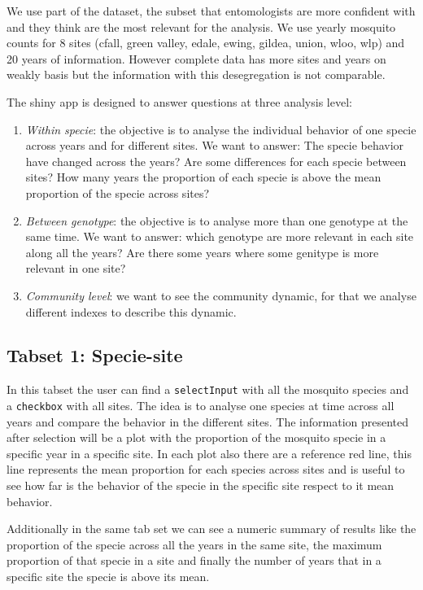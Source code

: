 \documentclass{article}\usepackage[]{graphicx}\usepackage[]{color}
\begin{document}
We use part of the dataset, the subset that entomologists are more confident with and they think are the most relevant for the analysis. We use yearly mosquito counts for 8 sites (cfall, green valley, edale, ewing, gildea, union, wloo, wlp) and 20 years of information. However complete data has more sites and years on weakly basis but the information with this desegregation is not comparable. 

The shiny app is designed to answer questions at three analysis level:
\begin{enumerate}
\item \textit{Within specie}:  the objective is to analyse the individual behavior of one specie across years and for different sites. We want to answer:
The specie behavior have changed across the years? Are some differences for each specie between sites?  How many years the proportion of each specie is above the mean proportion of the specie across sites?
\item \textit{Between genotype}: the objective is to analyse more than one genotype at the same time. We want to answer: which genotype are more relevant in each site along all the years? Are there some years where some genitype is more relevant in one site?
\item \textit{Community level}: we want to see the community dynamic, for that we analyse different indexes to describe this dynamic. 
\end{enumerate}


\subsection{Tabset 1: Specie-site}
In this tabset the user can find a {\tt selectInput} with all the mosquito species and a {\tt checkbox} with all sites. The idea is to analyse one species at time across all years and compare the behavior in the different sites. The information presented after selection will be a plot with the proportion of the mosquito specie in a specific year in a specific site. In each plot also there are a reference red line, this line represents the mean proportion for each species across sites  and is useful to see how far is the behavior of the specie in the specific site respect to it mean behavior.

Additionally in the same tab set we can see a numeric summary of results like the proportion of the specie across all the years in the same site, the maximum proportion of that specie in a site and finally the number of years that in a specific site the specie is above its mean.
\end{document}
